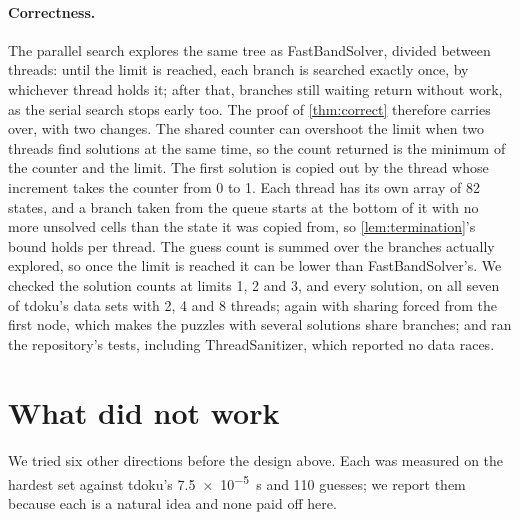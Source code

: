 \documentclass[11pt]{article}
\theoremstyle{definition}
\theoremstyle{plain}
\begin{document}
\paragraph{Correctness.} The parallel search explores the same tree as FastBandSolver, divided between threads: until the limit is reached,
each branch is searched exactly once, by whichever thread holds it; after that, branches still waiting return without
work, as the serial search stops early too. The proof of \cref{thm:correct} therefore carries over, with two changes. The shared counter can overshoot the limit when two threads find solutions at the same time, so the
count returned is the minimum of the counter and the limit. The first solution is copied out by the thread whose increment takes the counter from 0 to 1. Each thread has its own
array of 82 states, and a branch taken from the queue starts at the bottom of it with no more unsolved cells than the
state it was copied from, so \cref{lem:termination}'s bound holds per thread. The guess count is summed over the
branches actually explored, so once the limit is reached it can be lower than FastBandSolver's. We checked the solution counts at limits 1, 2 and 3, and every solution, on
all seven of tdoku's data sets with 2, 4 and 8 threads; again with sharing forced from the first node, which makes the
puzzles with several solutions share branches; and ran the repository's tests, including ThreadSanitizer, which reported
no data races.

\section{What did not work}
\label{sec:negative}

We tried six other directions before the design above. Each was measured on the hardest set against tdoku's
\SI{7.5e-5}{\second} and 110 guesses; we report them because each is a natural idea and none paid off here.
\end{document}
